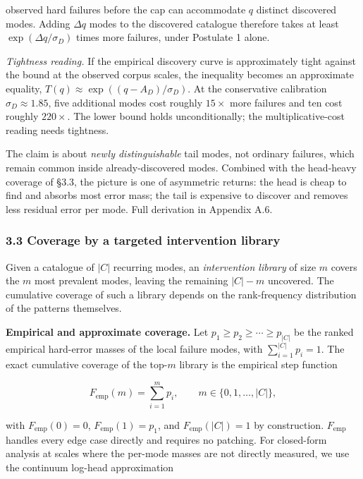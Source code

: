 \documentclass[
]{article}
\begin{document}
observed hard failures before the cap can accommodate \(q\) distinct
discovered modes. Adding \(\Delta q\) modes to the discovered catalogue
therefore takes at least \(\exp(\Delta q / \sigma_D)\) times more
failures, under Postulate 1 alone.

\emph{Tightness reading.} If the empirical discovery curve is
approximately tight against the bound at the observed corpus scales, the
inequality becomes an approximate equality,
\(T(q) \approx \exp((q - A_D)/\sigma_D)\). At the conservative
calibration \(\sigma_D \approx 1.85\), five additional modes cost
roughly \(15\times\) more failures and ten cost roughly \(220\times\).
The lower bound holds unconditionally; the multiplicative-cost reading
needs tightness.

The claim is about \emph{newly distinguishable} tail modes, not ordinary
failures, which remain common inside already-discovered modes. Combined
with the head-heavy coverage of §3.3, the picture is one of asymmetric
returns: the head is cheap to find and absorbs most error mass; the tail
is expensive to discover and removes less residual error per mode. Full
derivation in Appendix A.6.

\subsubsection{3.3 Coverage by a targeted intervention
library}\label{coverage-by-a-targeted-intervention-library}

Given a catalogue of \(|C|\) recurring modes, an \emph{intervention
library} of size \(m\) covers the \(m\) most prevalent modes, leaving
the remaining \(|C| - m\) uncovered. The cumulative coverage of such a
library depends on the rank-frequency distribution of the patterns
themselves.

\textbf{Empirical and approximate coverage.} Let
\(p_1 \geq p_2 \geq \cdots \geq p_{|C|}\) be the ranked empirical
hard-error masses of the local failure modes, with
\(\sum_{i=1}^{|C|} p_i = 1\). The exact cumulative coverage of the
top-\(m\) library is the empirical step function

\[
F_{\text{emp}}(m) = \sum_{i=1}^{m} p_i, \qquad m \in \{0, 1, \ldots, |C|\},
\]

with \(F_{\text{emp}}(0) = 0\), \(F_{\text{emp}}(1) = p_1\), and
\(F_{\text{emp}}(|C|) = 1\) by construction. \(F_{\text{emp}}\) handles
every edge case directly and requires no patching. For closed-form
analysis at scales where the per-mode masses are not directly measured,
we use the continuum log-head approximation
\end{document}
